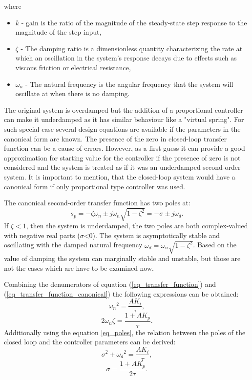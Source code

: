 \documentclass[12pt,english,twoside]{article}
\begin{document}
where
\begin{itemize}
	\item $k$ - gain is the ratio of the magnitude of the steady-state step response to the magnitude of the step input,
	\item $\zeta$ - The damping ratio is a dimensionless quantity characterizing the rate at which an oscillation in the system's response 		decays due to effects such as viscous friction or electrical resistance,
	\item $\omega_n$ - The natural frequency is the angular frequency that the system will oscillate at when there is no damping. \cite{dc_motor_3}
\end{itemize}

The original system is overdamped but the addition of a proportional controller can make it underdamped as it has similar behaviour like a "virtual spring". For such special case several design equations are available if the parameters in the canonical form are known. The presence of the zero in closed-loop transfer function can be a cause of errors. However, as a first guess it can provide a good approximation for starting value for the controller if the presence of zero is not considered and the system is treated as if it was an underdamped second-order system.
It is important to mention, that the closed-loop system would have a canonical form if only proportional type controller was used.

The canonical second-order transfer function has two poles at:
\begin{equation}
s_p = -\zeta \omega_n \pm j \omega_n \sqrt{1-{\zeta}^2} = -\sigma \pm j\omega_d.
\label{eq_poles}
\end{equation}
If $\zeta<1$, then the system is underdamped, the two poles are both complex-valued with negative real parts ($\sigma$<0). The system is asymptotically stable and oscillating with the damped natural frequency $\omega_d = \omega_n \sqrt{1-{\zeta}^2}$. Based on the value of damping the system can marginally stable and unstable, but those are not the cases which are have to be examined now.

Combining the denumerators of equation (\ref{eq_transfer_function}) and (\ref{eq_transfer_function_canonical}) the following expressions can be obtained:
\begin{equation}
{\omega_n}^2 = \frac{A K_i}{\tau},
\end{equation}
\begin{equation}
2\omega_n\zeta  = \frac{1+A K_p}{\tau}.
\end{equation}
Additionally using the equation \ref{eq_poles}, the relation between the poles of the closed loop and the controller parameters can be derived:
\begin{equation}
\sigma^2 + {\omega_d}^2 = \frac{A K_i}{\tau},
\label{eq_pi_from_poles_1}
\end{equation}
\begin{equation}
\sigma = \frac{1+A K_p}{2\tau}.
\label{eq_pi_from_poles_2}
\end{equation}
\end{document}
